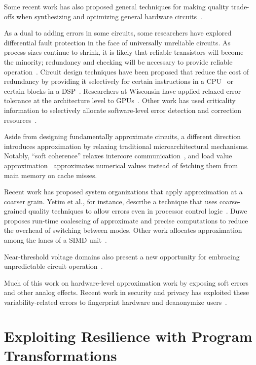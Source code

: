 Some recent work has also proposed general techniques for making quality trade-offs
when synthesizing and optimizing general hardware
circuits~\cite{lossysynthesis, palem-pruning, rahimi, axilog, miao-thesis}.

As a dual to adding errors in some circuits, some researchers have
explored differential fault protection in the face of universally unreliable
circuits. As process sizes continue to shrink, it is likely that reliable
transistors will become the minority; redundancy and checking will be
necessary to provide reliable operation~\cite{li-asplos08}. Circuit design
techniques have been proposed that reduce the cost of redundancy by providing
it selectively for certain instructions in a CPU~\cite{wreft} or certain
blocks in a DSP~\cite{unequal-protection, ant}.
Researchers at Wisconsin have applied relaxed error tolerance at the
architecture level to GPUs~\cite{palframan-gpu}.
Other work has used criticality information to selectively allocate
software-level error detection and correction
resources~\cite{khudia-tolerance, shi-cal}.

Aside from designing fundamentally approximate circuits, a different direction
introduces approximation by relaxing traditional microarchitectural
mechanisms.
Notably, ``soft coherence'' relaxes intercore
communication~\cite{softcoherence},
and load value approximation~\cite{lva-sanmiguel, lva-thwaites} approximates
numerical values instead of fetching them from main memory on cache misses.

Recent work has proposed system organizations that apply approximation at a
coarser grain.
Yetim et al., for instance,
describe a technique that uses coarse-grained quality techniques to
allow errors even in processor control logic~\cite{martonosi-date, commguard}.
Duwe~\cite{duwe-thesis} proposes run-time coalescing of approximate and
precise computations to reduce the overhead of switching between modes.
Other work allocates approximation among the lanes of a SIMD
unit~\cite{tabsh}.

Near-threshold voltage domains also present a new opportunity for embracing
unpredictable circuit operation~\cite{soft-ntc}.

Much of this work on hardware-level approximation work by exposing
soft errors and other analog effects.
Recent work in security and privacy has exploited these variability-related
errors to fingerprint hardware and deanonymize users~\cite{deanondram}.




\section{Exploiting Resilience with Program Transformations}
\label{sec:related:software}

